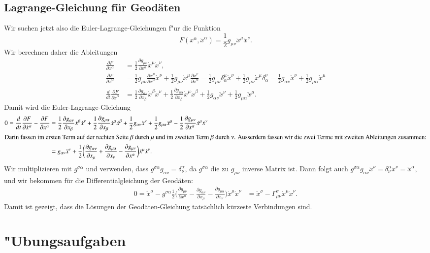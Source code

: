 \subsection{Lagrange-Gleichung für Geodäten}
Wir suchen jetzt also die Euler-Lagrange-Gleichungen f"ur die Funktion
\[
F(x^\alpha, \dot x^\alpha) = \frac12 g_{\mu\nu} \dot x^\mu \dot x^\nu.
\]
Wir berechnen daher die Ableitungen
\begin{align*}
\frac{\partial F}{\partial x^\alpha}
&=
\frac12\frac{\partial g_{\mu\nu}}{\partial x^\alpha} \dot x^\mu \dot x^\nu,
\\
\frac{\partial F}{\partial \dot x^\alpha}
&=
\frac12 g_{\mu\nu}\frac{\partial \dot x^\mu}{\partial \dot x^\alpha}\dot x^\nu
+
\frac12 g_{\mu\nu}\dot x^\mu \frac{\partial \dot x^\nu}{\partial \dot x^\alpha}
=
\frac12 g_{\mu\nu}\delta^\mu_\alpha \dot x^\nu
+
\frac12 g_{\mu\nu}\dot x^\mu \delta^\nu_\alpha 
=
\frac12 g_{\alpha\nu}\dot x^\nu
+
\frac12 g_{\mu\alpha}\dot x^\mu 
\\
\frac{d}{dt}\frac{\partial F}{\partial \dot x^\alpha}
&=
\frac12\frac{\partial g_{\alpha\nu}}{\partial x_{\beta}}\dot x^\beta\dot x^\nu
+
\frac12\frac{\partial g_{\mu\alpha}}{\partial x_{\beta}}\dot x^\mu\dot x^\beta
+
\frac12g_{\alpha\nu}\ddot x^\nu
+
\frac12g_{\mu\alpha}\ddot x^\mu.
\end{align*}
Damit wird die Euler-Lagrange-Gleichung
\begin{align*}
0=
\frac{d}{dt}\frac{\partial F}{\partial \dot x^\alpha}
-
\frac{\partial F}{\partial x^\alpha}
&=
\frac12
\frac{\partial g_{\alpha\nu}}{\partial x_{\beta}}\dot x^\beta\dot x^\nu
+
\frac12
\frac{\partial g_{\mu\alpha}}{\partial x_{\beta}}\dot x^\mu\dot x^\beta
+
\frac12
g_{\alpha\nu}\ddot x^\nu
+
\frac12
g_{\mu\alpha}\ddot x^\mu
-
\frac12\frac{\partial g_{\mu\nu}}{\partial x^\alpha} \dot x^\mu \dot x^\nu
\\
\intertext{Darin fassen im ersten Term auf der rechten Seite
$\beta$ durch $\mu$ und im zweiten Term $\beta$ durch $\nu$.
Ausserdem fassen wir die zwei Terme mit zweiten Ableitungen zusammen:}
&=
g_{\alpha\nu}\ddot x^\nu
+
\frac12
\biggl(
\frac{\partial g_{\alpha\nu}}{\partial x_\mu}
+
\frac{\partial g_{\mu\alpha}}{\partial x_\nu}
-
\frac{\partial g_{\mu\nu}}{\partial x^\alpha}
\biggr)\dot x^\mu\dot x^\nu.
\end{align*}
Wir multiplizieren mit $g^{\sigma\alpha}$ und verwenden,
dass $g^{\sigma\alpha}g_{\alpha\nu} = \delta_\nu^\alpha$, da $g^{\sigma\alpha}$
die zu $g_{\mu\nu}$ inverse Matrix ist.
Dann folgt auch
$g^{\sigma\alpha}g_{\alpha\nu}\ddot x^\nu
=
\delta_\nu^\alpha\ddot x^\nu
=
\ddot x^\alpha$, und
wir bekommen für die Differentialgleichung der Geodäten:
\begin{align*}
0=
\ddot x^\sigma
-
g^{\sigma\alpha}\frac12\biggl(
\frac{\partial g_{\mu\nu}}{\partial x^\alpha}
-
\frac{\partial g_{\alpha\nu}}{\partial x_{\mu}}
-
\frac{\partial g_{\mu\alpha}}{\partial x_{\nu}}
\biggr)
\dot x^\mu\dot x^\nu
&=
\ddot x^\sigma
-
\Gamma_{\mu\nu}^\sigma \dot x^\mu\dot x^\nu.
\end{align*}
Damit ist gezeigt, dass die Lösungen der Geodäten-Gleichung tatsächlich
kürzeste Verbindungen sind.

\section{"Ubungsaufgaben}

